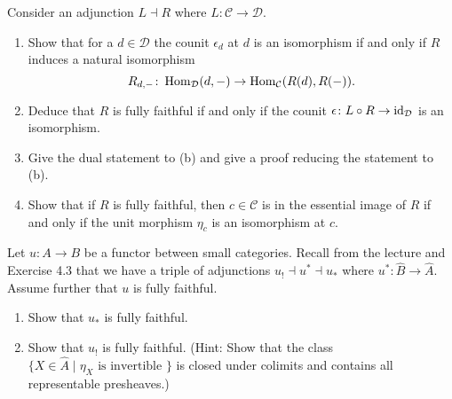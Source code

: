 \begin{Exercise}
    Consider an adjunction $ L \dashv R $ where $ L \colon \mathcal{ C } \to \mathcal{ D } $.
    
    \begin{enumerate}[label=(\alph*)]
    
        \item 
        Show that for a $ d \in \mathcal{ D } $ the counit $ \epsilon_d $ at $ d $ is an isomorphism if and only if $ R $ induces a natural isomorphism 
        \[
            R_{d,-}\colon \operatorname{Hom}_{\mathcal{ D } } ( d, - ) \to \operatorname{Hom}_{ \mathcal{ C } } ( R ( d ) , R ( - ) ). 
        \]
    
        \item 
        Deduce that $ R $ is fully faithful if and only if the counit $ \epsilon \colon L \circ R  \to \operatorname{id}_{\mathcal{ D } } $ is an isomorphism.
    
        \item 
        Give the dual statement to (b) and give a proof reducing the statement to (b).
    
        \item 
        Show that if $ R $ is fully faithful, then $ c \in \mathcal{ C } $ is in the essential image of $ R $ if and only if the unit morphism $ \eta_c $ is an isomorphism at $ c $.
        
    \end{enumerate}
\end{Exercise}

\begin{Exercise}
    Let $ u \colon A \to B $ be a functor between small categories.
    Recall from the lecture and Exercise 4.3 that we have a triple of adjunctions $ u_! \dashv u^* \dashv u_* $ where $ u^* \colon  \widehat{ B } \to \widehat{ A } $. 
    Assume further that $ u $ is fully faithful.
    
    \begin{enumerate}[label=(\alph*)]
    
        \item 
        Show that $ u_* $ is fully faithful. 
    
        \item   
        Show that $ u_! $ is fully faithful.
        \newline
        (Hint: Show that the class $ \{ X \in \widehat{ A } \mid \eta_X \text{ is invertible } \} $ is closed under colimits and contains all representable presheaves.)
        
    \end{enumerate}
\end{Exercise} 